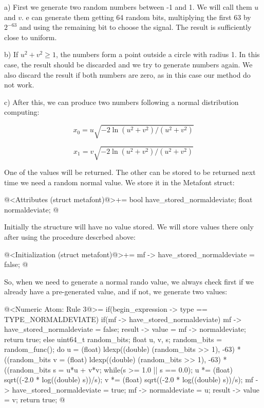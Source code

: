 a) First we generate two random numbers between -1 and 1. We will call
them $u$ and $v$. e can generate them getting 64 random bits,
multiplying the first 63 by $2^{-63}$ and using the remaining bit to
choose the signal. The result is sufficiently close to uniform.

b) If $u^2+v^2\geq 1$, the numbers form a point outside a circle with
radius 1. In this case, the result should be discarded and we try to
generate numbers again. We also discard the result if both numbers are
zero, as in this case our method do not work.

c) After this, we can produce two numbers following a normal
distribution computing:

$$
x_0 = u\sqrt{-2\ln(u^2+v^2)/(u^2+v^2)}
$$

$$
x_1 = v\sqrt{-2\ln(u^2+v^2)/(u^2+v^2)}
$$

One of the values will be returned. The other can be stored to be
returned next time we need a random normal value. We store it in the
Metafont struct:

\iniciocodigo
@<Attributes (struct metafont)@>+=
  bool have_stored_normaldeviate;
  float normaldeviate;
@
\fimcodigo

Initially the structure will have no value stored. We will store
values there only after using the procedure descrbed above:

\iniciocodigo
@<Initialization (struct metafont)@>+=
mf -> have_stored_normaldeviate = false;
@
\fimcodigo

So, when we need to generate a normal rando value, we always check
first if we already have a pre-generated value, and if not, we
generate two values:

\iniciocodigo
@<Numeric Atom: Rule 3@>=
if(begin_expression -> type == TYPE_NORMALDEVIATE){
  if(mf -> have_stored_normaldeviate){
    mf -> have_stored_normaldeviate = false;
    result -> value = mf -> normaldeviate;
    return true;
  }
  else{
    uint64_t random_bits;
    float u, v, s;
    random_bits = random_func();
    do{
      u = (float) ldexp((double) (random_bits >> 1), -63) *
            ((random_bits %
      v = (float) ldexp((double) (random_bits >> 1), -63) *
            ((random_bits %
      s = u*u + v*v;
    } while(s >= 1.0 || s == 0.0);
    u *= (float) sqrt((-2.0 * log((double) s))/s);
    v *= (float) sqrt((-2.0 * log((double) s))/s);
    mf -> have_stored_normaldeviate = true;
    mf -> normaldeviate = u;
    result -> value = v;
    return true;
  }
}
@
\fimcodigo

